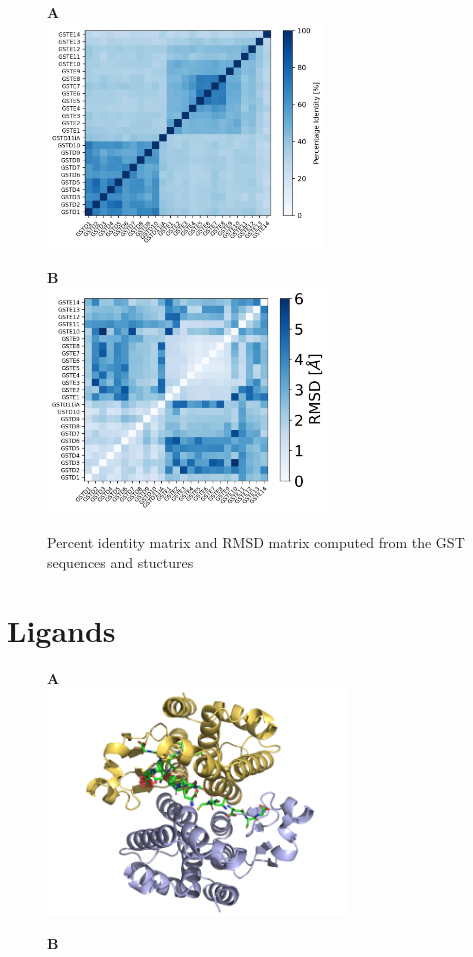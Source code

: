 \begin{figure}[h!]
	\label{Sequence and Structure matricies}
	\begin{minipage}{.48\linewidth}
		\textbf{A}\\
		\includegraphics[height = 6cm]{figures/PercentID_matrix.jpg}
	\end{minipage}
	\begin{minipage}{.48\linewidth}
		\textbf{B}\\
		\includegraphics[height = 6cm]{figures/RMSD_matrix.jpg}
	\end{minipage}
	\caption{Percent identity matrix and RMSD matrix computed from the GST sequences and stuctures}
\end{figure}

\section{Ligands}

\begin{figure}[h!]
	\label{AlphaFill & GSHs}
	\begin{minipage}{.48\linewidth}
		\textbf{A}\\
		\includegraphics[height = 6cm]{figures/GSTD1_GSHs.png}
	\end{minipage}
	\begin{minipage}{.48\linewidth}
		\textbf{B}\\
	\end{minipage}
\end{figure}

